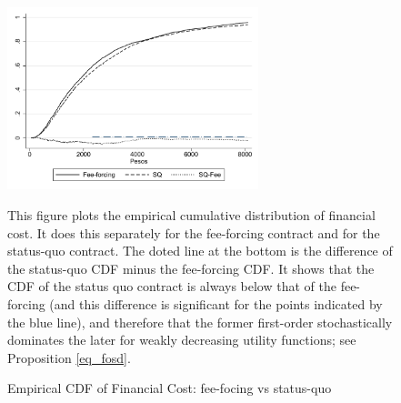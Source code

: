 \documentclass[oneside,11pt]{article}
\begin{document}
\vspace{.2in}
\begin{figure}[H]
        \caption{Empirical CDF of Financial Cost: fee-focing vs status-quo}
    \label{ecdf_fc}
    \begin{center}
        \centering
        \includegraphics[width=0.65\textwidth]{Figuras/cdf_fc_pro_2.pdf}
    \end{center}
    \scriptsize This figure plots the empirical cumulative distribution of financial cost. It does this separately for the fee-forcing contract and for the status-quo contract. The doted line at the bottom is the difference of the status-quo CDF minus the fee-forcing CDF. It shows that the CDF of the status quo contract is always below that of the fee-forcing (and this difference is significant for the points indicated by the blue line), and therefore that the former first-order stochastically dominates the later for weakly decreasing utility functions; see Proposition \ref{eq_fosd}.
\end{figure}
\end{document}
